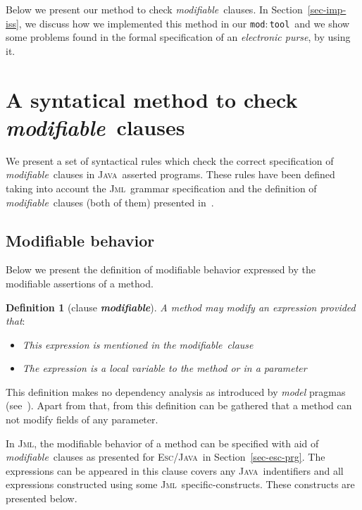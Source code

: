 \documentclass[a4paper]{llncs}
\newcommand{\jml}{\textsc{Jml}}
\newcommand{\escj}{\textsc{Esc/Java}}
\newcommand{\java}{\textsc{Java}}
\newcommand{\modtool}{\texttt{mod$:$tool}}
\newcommand{\modif}{\textit{modifiable}}
\newtheorem {df}{Definition}
\begin{document}
Below we present our method to check \modif~clauses. In
Section~\ref{sec-imp-iss}, we discuss how we implemented this method
in our \modtool~and we show
some problems found in the formal specification of an
\emph{electronic purse}, by using it.






\section{A syntatical method to check \modif~clauses}
\label{sec-giv-sin-def}
We present a set of syntactical rules which check the correct
specification of \modif~clauses in \java~asserted programs. These
rules have been defined taking into account the \jml~grammar
specification and the definition of \modif~clauses (both of them)
presented in~\cite{LBR00}.




\subsection{Modifiable behavior}
Below we present the definition of modifiable behavior
expressed by the modifiable assertions of a method.
\begin{df}[clause {\bf \it modifiable}]
\label{def-mod}
A method may modify an expression provided that$:$ 
\begin{itemize}
\item This expression is mentioned in the \modif~clause
\item The expression is a local variable to the method or in a
parameter
\end{itemize}
\end{df}
This definition makes no dependency analysis as introduced by
\emph{model} pragmas (see~\cite{LBR00}). Apart from that, from this definition can be
gathered that a method can not modify fields of any parameter.

In \jml, the modifiable behavior of a method can be specified with
aid of \modif~clauses as presented for \escj~in
Section~\ref{sec-esc-prg}. The expressions can be appeared in this
clause covers any
\java~indentifiers and all expressions constructed using some
\jml~specific-constructs. These constructs are presented below.
\end{document}
